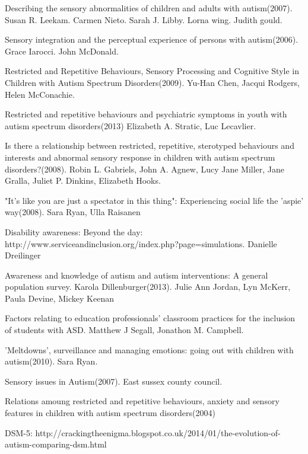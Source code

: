 \documentclass[11pt]{report}
\begin{document}
\begin{thebibliography}{9}
Describing the sensory abnormalities of children and adults with autism(2007). Susan R. Leekam. Carmen Nieto. Sarah J. Libby. Lorna wing. Judith gould. 

Sensory integration and the perceptual experience of persons with autism(2006). Grace Iarocci. John McDonald.

Restricted and Repetitive Behaviours, Sensory Processing and Cognitive Style in Children with Autism Spectrum Disorders(2009). Yu-Han Chen, Jacqui Rodgers, Helen McConachie.

Restricted and repetitive behaviours and psychiatric symptoms in youth with autism spectrum disorders(2013) Elizabeth A. Stratic, Luc Lecavlier.

Is there a relationship between restricted, repetitive, sterotyped behaviours and interests and abnormal sensory response in children with autism spectrum disorders?(2008). Robin L. Gabriels, John A. Agnew, Lucy Jane Miller, Jane Gralla, Juliet P. Dinkins, Elizabeth Hooks.

"It’s like you are just a spectator in this thing": Experiencing social life the 'aspie' way(2008). Sara Ryan, Ulla Raisanen

Disability awareness: Beyond the day: http://www.serviceandinclusion.org/index.php?page=simulations. Danielle Dreilinger

Awareness and knowledge of autism and autism interventions: A general population survey. Karola Dillenburger(2013). Julie Ann Jordan, Lyn McKerr, Paula Devine, Mickey Keenan

Factors relating to education professionals' classroom practices for the inclusion of students with ASD. Matthew J Segall, Jonathon M. Campbell. 

'Meltdowns', surveillance and managing emotions: going out with children with autism(2010). Sara Ryan.

Sensory issues in Autism(2007). East sussex county council. 

Relations amoung restricted and repetitive behaviours, anxiety and sensory features in children with autism spectrum disorders(2004)

DSM-5: http://crackingtheenigma.blogspot.co.uk/2014/01/the-evolution-of-autism-comparing-dsm.html


\end{thebibliography}
\end{document}

